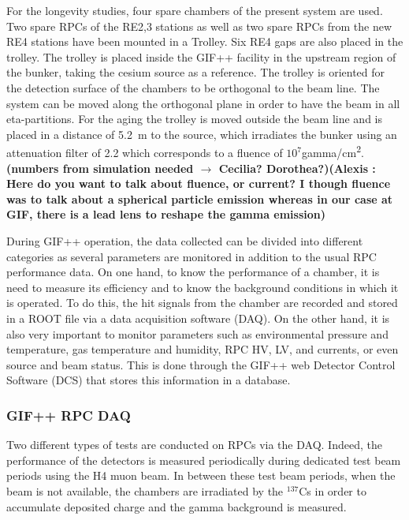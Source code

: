 		For the longevity studies, four spare chambers of the present system are used. Two spare RPCs of the RE2,3 stations as well as two spare RPCs from the new RE4 stations have been mounted in a Trolley. Six RE4 gaps are also placed in the trolley. The trolley is placed inside the GIF++ facility in the upstream region of the bunker, taking the cesium source as a reference. The trolley is oriented for the detection surface of the chambers to be orthogonal to the beam line. The system can be moved along the orthogonal plane in order to have the beam in all eta-partitions. For the aging the trolley is moved outside the beam line and is placed in a distance of \SI{5.2}{m} to the source, which irradiates the bunker using an attenuation filter of 2.2 which corresponds to a fluence of $10^7$\si{gamma/cm\squared}. \textbf{(numbers from simulation needed $\rightarrow$ Cecilia? Dorothea?)}\textbf{(Alexis : Here do you want to talk about fluence, or current? I though fluence was to talk about a spherical particle emission whereas in our case at GIF, there is a lead lens to reshape the gamma emission)}

		During GIF++ operation, the data collected can be divided into different categories as several parameters are monitored in addition to the usual RPC performance data. On one hand, to know the performance of a chamber, it is need to measure its efficiency and to know the background conditions in which it is operated. To do this, the hit signals from the chamber are recorded and stored in a ROOT file via a data acquisition software (DAQ). On the other hand, it is also very important to monitor parameters such as environmental pressure and temperature, gas temperature and humidity, RPC HV, LV, and currents, or even source and beam status. This is done through the GIF++ web Detector Control Software (DCS) that stores this information in a database.

			\subsubsection{GIF++ RPC DAQ}
            
			Two different types of tests are conducted on RPCs via the DAQ. Indeed, the performance of the detectors is measured periodically during dedicated test beam periods using the H4 muon beam. In between these test beam periods, when the beam is not available, the chambers are irradiated by the $^{137}$Cs in order to accumulate deposited charge and the gamma background is measured.

